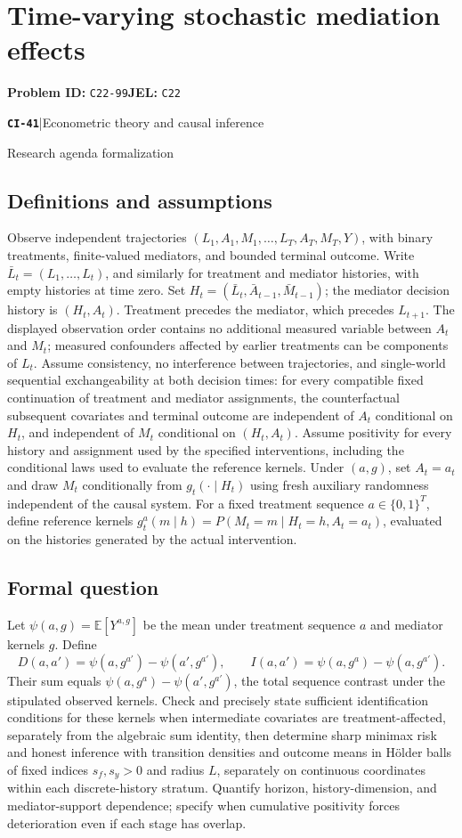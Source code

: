 \documentclass[11pt,a4paper]{article}
\newcommand{\E}{\mathbb E}
\newcommand{\entrymeta}[3]{{\sffamily\small\color{muted}\textbf{\texttt{#1}}\quad|\quad #2\par #3\par}}
\begin{document}
\section*{Time-varying stochastic mediation effects}
\textbf{Problem ID:} \texttt{C22-99}\quad \textbf{JEL:} \texttt{C22}\par
\label{problem:OP-0520}
\label{beyond:CI-41}
\entrymeta{CI-41}{Econometric theory and causal inference}{Research agenda formalization}
\subsection*{Definitions and assumptions}
Observe independent trajectories $(L_1,A_1,M_1,\ldots,L_T,A_T,M_T,Y)$, with binary treatments, finite-valued mediators, and bounded terminal outcome. Write $\bar L_t=(L_1,\ldots,L_t)$, and similarly for treatment and mediator histories, with empty histories at time zero. Set $H_t=(\bar L_t,\bar A_{t-1},\bar M_{t-1})$; the mediator decision history is $(H_t,A_t)$. Treatment precedes the mediator, which precedes $L_{t+1}$. The displayed observation order contains no additional measured variable between $A_t$ and $M_t$; measured confounders affected by earlier treatments can be components of $L_t$. Assume consistency, no interference between trajectories, and single-world sequential exchangeability at both decision times: for every compatible fixed continuation of treatment and mediator assignments, the counterfactual subsequent covariates and terminal outcome are independent of $A_t$ conditional on $H_t$, and independent of $M_t$ conditional on $(H_t,A_t)$. Assume positivity for every history and assignment used by the specified interventions, including the conditional laws used to evaluate the reference kernels. Under $(a,g)$, set $A_t=a_t$ and draw $M_t$ conditionally from $g_t(\cdot\mid H_t)$ using fresh auxiliary randomness independent of the causal system. For a fixed treatment sequence $a\in\{0,1\}^T$, define reference kernels $g_t^a(m\mid h)=P(M_t=m\mid H_t=h,A_t=a_t)$, evaluated on the histories generated by the actual intervention.
\subsection*{Formal question}
Let $\psi(a,g)=\E[Y^{a,g}]$ be the mean under treatment sequence $a$ and mediator kernels $g$. Define
\[
 D(a,a')=\psi(a,g^{a'})-\psi(a',g^{a'}),\qquad
 I(a,a')=\psi(a,g^a)-\psi(a,g^{a'}).
\]
Their sum equals $\psi(a,g^a)-\psi(a',g^{a'})$, the total sequence contrast under the stipulated observed kernels. Check and precisely state sufficient identification conditions for these kernels when intermediate covariates are treatment-affected, separately from the algebraic sum identity, then determine sharp minimax risk and honest inference with transition densities and outcome means in H\"older balls of fixed indices $s_f,s_y>0$ and radius $L$, separately on continuous coordinates within each discrete-history stratum. Quantify horizon, history-dimension, and mediator-support dependence; specify when cumulative positivity forces deterioration even if each stage has overlap.
\end{document}
